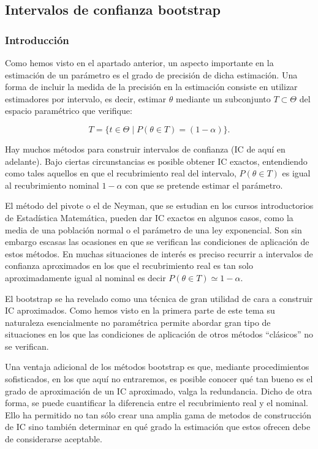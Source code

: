 \documentclass[
]{article}
\begin{document}
\subsection{Intervalos de confianza bootstrap}\label{intervalos-de-confianza-bootstrap}

\subsubsection{Introducción}\label{introducciuxf3n-11}

Como hemos visto en el apartado anterior, un aspecto importante en la estimación de un parámetro es el grado de precisión de dicha estimación. Una forma de incluir la medida de la precisión en la estimación consiste en utilizar estimadores por intervalo, es decir, estimar \(\theta\) mediante un subconjunto \(T \subset \Theta\) del espacio paramétrico que verifique:

\[
T=\{t \in \Theta \mid P(\theta \in T)=(1-\alpha)\} .
\]

Hay muchos métodos para construir intervalos de confianza (IC de aquí en adelante). Bajo ciertas circunstancias es posible obtener IC exactos, entendiendo como tales aquellos en que el recubrimiento real del intervalo, \(P(\theta \in T)\) es igual al recubrimiento nominal \(1-\alpha\) con que se pretende estimar el parámetro.

El método del pivote o el de Neyman, que se estudian en los cursos introductorios de Estadística Matemática, pueden dar IC exactos en algunos casos, como la media de una población normal o el parámetro de una ley exponencial. Son sin embargo escasas las ocasiones en que se verifican las condiciones de aplicación de estos métodos. En muchas situaciones de interés es preciso recurrir a intervalos de confianza aproximados en los que el recubrimiento real es tan solo aproximadamente igual al nominal es decir \(P(\theta \in T) \simeq 1-\alpha\).

El bootstrap se ha revelado como una técnica de gran utilidad de cara a construir IC aproximados. Como hemos visto en la primera parte de este tema su naturaleza esencialmente no paramétrica permite abordar gran tipo
de situaciones en los que las condiciones de aplicación de otros métodos ``clásicos'' no se verifican.

Una ventaja adicional de los métodos bootstrap es que, mediante procedimientos sofisticados, en los que aquí no entraremos, es posible conocer qué tan bueno es el grado de aproximación de un IC aproximado, valga la redundancia. Dicho de otra forma, se puede cuantificar la diferencia entre el recubrimiento real y el nominal. Ello ha permitido no tan sólo crear una amplia gama de metodos de construcción de IC sino también determinar en qué grado la estimación que estos ofrecen debe de considerarse aceptable.
\end{document}
